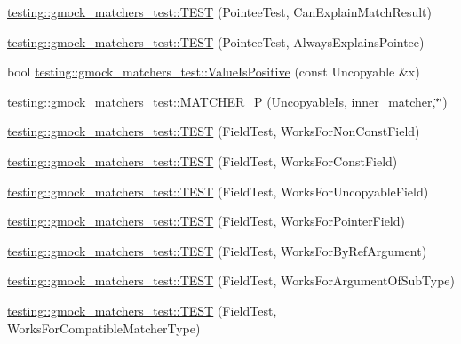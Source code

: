 \begin{DoxyCompactItemize}
\item 
\hyperlink{namespacetesting_1_1gmock__matchers__test_a263ede06f6b32a625bb40e4f4c58c8dc}{testing\+::gmock\+\_\+matchers\+\_\+test\+::\+T\+E\+ST} (Pointee\+Test, Can\+Explain\+Match\+Result)
\item 
\hyperlink{namespacetesting_1_1gmock__matchers__test_a00128de027ff6f49f82a7011dd346d43}{testing\+::gmock\+\_\+matchers\+\_\+test\+::\+T\+E\+ST} (Pointee\+Test, Always\+Explains\+Pointee)
\item 
bool \hyperlink{namespacetesting_1_1gmock__matchers__test_a7c429b4fa8a7835724d9e28033e908b2}{testing\+::gmock\+\_\+matchers\+\_\+test\+::\+Value\+Is\+Positive} (const Uncopyable \&x)
\item 
\hyperlink{namespacetesting_1_1gmock__matchers__test_afcdfddd9d56b20c0692a360115189836}{testing\+::gmock\+\_\+matchers\+\_\+test\+::\+M\+A\+T\+C\+H\+E\+R\+\_\+P} (Uncopyable\+Is, inner\+\_\+matcher,\char`\"{}\char`\"{})
\item 
\hyperlink{namespacetesting_1_1gmock__matchers__test_a57213a63527bbd66c024dd1cfafe92d1}{testing\+::gmock\+\_\+matchers\+\_\+test\+::\+T\+E\+ST} (Field\+Test, Works\+For\+Non\+Const\+Field)
\item 
\hyperlink{namespacetesting_1_1gmock__matchers__test_a065efc397a420d3dde87909b4a9a6285}{testing\+::gmock\+\_\+matchers\+\_\+test\+::\+T\+E\+ST} (Field\+Test, Works\+For\+Const\+Field)
\item 
\hyperlink{namespacetesting_1_1gmock__matchers__test_ac26d681f09865b0727ca32343d974907}{testing\+::gmock\+\_\+matchers\+\_\+test\+::\+T\+E\+ST} (Field\+Test, Works\+For\+Uncopyable\+Field)
\item 
\hyperlink{namespacetesting_1_1gmock__matchers__test_a56b1c75b98aaa5c9d3a6dec2d3ba30dc}{testing\+::gmock\+\_\+matchers\+\_\+test\+::\+T\+E\+ST} (Field\+Test, Works\+For\+Pointer\+Field)
\item 
\hyperlink{namespacetesting_1_1gmock__matchers__test_afcb890c159493e250477408a453b08d1}{testing\+::gmock\+\_\+matchers\+\_\+test\+::\+T\+E\+ST} (Field\+Test, Works\+For\+By\+Ref\+Argument)
\item 
\hyperlink{namespacetesting_1_1gmock__matchers__test_ae720452c3587433e26bea2ea7e91f8e6}{testing\+::gmock\+\_\+matchers\+\_\+test\+::\+T\+E\+ST} (Field\+Test, Works\+For\+Argument\+Of\+Sub\+Type)
\item 
\hyperlink{namespacetesting_1_1gmock__matchers__test_a27058ed7297742f08419bc5feb3ef687}{testing\+::gmock\+\_\+matchers\+\_\+test\+::\+T\+E\+ST} (Field\+Test, Works\+For\+Compatible\+Matcher\+Type)

\end{DoxyCompactItemize}
